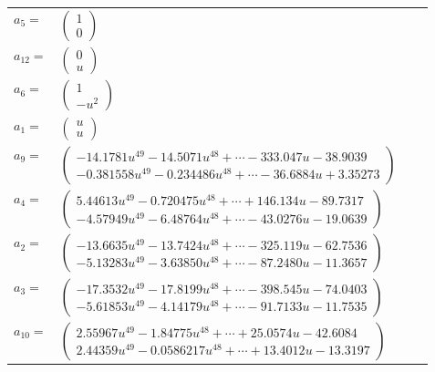 \documentclass[1p]{elsarticle_modified}
\theoremstyle{definition}
\begin{document}
\begin{tabular}{m{7pt} m{180pt} m{7pt} m{180pt} }
\flushright $a_{5}=$&$\begin{pmatrix}1\\0\end{pmatrix}$ \\
\flushright $a_{12}=$&$\begin{pmatrix}0\\u\end{pmatrix}$ \\
\flushright $a_{6}=$&$\begin{pmatrix}1\\- u^2\end{pmatrix}$ \\
\flushright $a_{1}=$&$\begin{pmatrix}u\\u\end{pmatrix}$ \\
\flushright $a_{9}=$&$\begin{pmatrix}-14.1781 u^{49}-14.5071 u^{48}+\cdots-333.047 u-38.9039\\-0.381558 u^{49}-0.234486 u^{48}+\cdots-36.6884 u+3.35273\end{pmatrix}$ \\
\flushright $a_{4}=$&$\begin{pmatrix}5.44613 u^{49}-0.720475 u^{48}+\cdots+146.134 u-89.7317\\-4.57949 u^{49}-6.48764 u^{48}+\cdots-43.0276 u-19.0639\end{pmatrix}$ \\
\flushright $a_{2}=$&$\begin{pmatrix}-13.6635 u^{49}-13.7424 u^{48}+\cdots-325.119 u-62.7536\\-5.13283 u^{49}-3.63850 u^{48}+\cdots-87.2480 u-11.3657\end{pmatrix}$ \\
\flushright $a_{3}=$&$\begin{pmatrix}-17.3532 u^{49}-17.8199 u^{48}+\cdots-398.545 u-74.0403\\-5.61853 u^{49}-4.14179 u^{48}+\cdots-91.7133 u-11.7535\end{pmatrix}$ \\
\flushright $a_{10}=$&$\begin{pmatrix}2.55967 u^{49}-1.84775 u^{48}+\cdots+25.0574 u-42.6084\\2.44359 u^{49}-0.0586217 u^{48}+\cdots+13.4012 u-13.3197\end{pmatrix}$ \\

\end{tabular}
\end{document}
